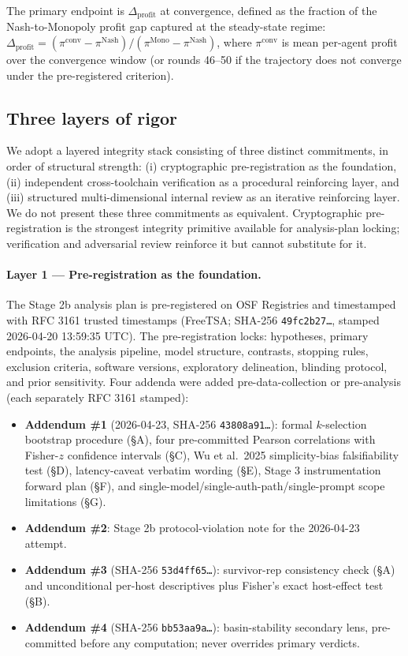 The primary endpoint is $\Delta_{\text{profit}}$ at convergence, defined as the fraction of the Nash-to-Monopoly profit gap captured at the steady-state regime: $\Delta_{\text{profit}} = (\pi^{\text{conv}} - \pi^{\text{Nash}}) / (\pi^{\text{Mono}} - \pi^{\text{Nash}})$, where $\pi^{\text{conv}}$ is mean per-agent profit over the convergence window (or rounds 46--50 if the trajectory does not converge under the pre-registered criterion).

\subsection{Three layers of rigor}
\label{sec:methods-rigor}

We adopt a layered integrity stack consisting of three distinct commitments, in order of structural strength: (i) cryptographic pre-registration as the foundation, (ii) independent cross-toolchain verification as a procedural reinforcing layer, and (iii) structured multi-dimensional internal review as an iterative reinforcing layer. We do not present these three commitments as equivalent. Cryptographic pre-registration is the strongest integrity primitive available for analysis-plan locking; verification and adversarial review reinforce it but cannot substitute for it.

\paragraph{Layer 1 --- Pre-registration as the foundation.}
The Stage 2b analysis plan is pre-registered on OSF Registries and timestamped with RFC 3161 trusted timestamps (FreeTSA; SHA-256 \texttt{49fc2b27\ldots}, stamped 2026-04-20 13:59:35 UTC). The pre-registration locks: hypotheses, primary endpoints, the analysis pipeline, model structure, contrasts, stopping rules, exclusion criteria, software versions, exploratory delineation, blinding protocol, and prior sensitivity. Four addenda were added pre-data-collection or pre-analysis (each separately RFC 3161 stamped):

\begin{itemize}
    \item \textbf{Addendum \#1} (2026-04-23, SHA-256 \texttt{43808a91\ldots}): formal $k$-selection bootstrap procedure (\S A), four pre-committed Pearson correlations with Fisher-$z$ confidence intervals (\S C), Wu et al.\ 2025 simplicity-bias falsifiability test (\S D), latency-caveat verbatim wording (\S E), Stage 3 instrumentation forward plan (\S F), and single-model/single-auth-path/single-prompt scope limitations (\S G).
    \item \textbf{Addendum \#2}: Stage 2b protocol-violation note for the 2026-04-23 attempt.
    \item \textbf{Addendum \#3} (SHA-256 \texttt{53d4ff65\ldots}): survivor-rep consistency check (\S A) and unconditional per-host descriptives plus Fisher's exact host-effect test (\S B).
    \item \textbf{Addendum \#4} (SHA-256 \texttt{bb53aa9a\ldots}): basin-stability secondary lens, pre-committed before any computation; never overrides primary verdicts.
\end{itemize}

